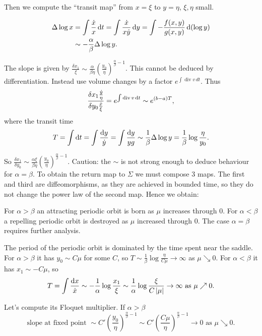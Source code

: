 \documentclass{notes}
\theoremstyle{plain}
\DeclareMathOperator{\dive}{div}
\begin{document}
Then we compute the ``transit map'' from $x=\xi$ to $y=\eta$, $\xi, \eta$
small.

\begin{align*}
\Delta \log x &= \int \frac{\dot{x}}{x}\, \mathrm{d} t
= \int \frac{\dot{x}}{x \dot{y}}\,\mathrm{d} y =
\int - \frac{f(x,y)}{g(x,y)}\,\mathrm{d}(\log y) \\
&\sim - \frac{\alpha}{\beta} \Delta \log y.
\end{align*}

The slope is given by $\frac{\delta x_1}{\xi} \sim \frac{\alpha}{\beta \eta}
\left( \frac{y_0}{\eta} \right)^{\frac{\alpha}{\beta}-1}$.  This cannot
be deduced by differentiation.  Instead use volume changes by a factor
$e^{\int \dive v\, dt}$.  Thus
\[
\frac{\delta x_1 \frac{\dot{y}}{\eta}}{\delta y_0 \frac{\dot{x}}{\xi}}
= e^{\int \dive v\,\ud t} \sim e^{(b-a)T},
\]
where the transit time
\[
T = \int \mathrm{d} t = \int \frac{\mathrm{d} y}{\dot{y}} = \int \frac{\mathrm{d} y}{y g}
\sim \frac{1}{\beta} \Delta \log y = \frac{1}{\beta} \log \frac{\eta}{y_0}.
\]
\parbox{3in}{
So $\frac{\delta x_1}{\delta y_0} \sim \frac{ \alpha \xi}{\beta \eta}
\left( \frac{y_0}{\eta} \right)^{\frac{\alpha}{\beta}-1}.$
Caution: the $\sim$ is not strong enough to deduce behaviour for
$\alpha = \beta$.  To obtain the return map to $\Sigma$ we must compose
3 maps.  The first and third are diffeomorphisms, as they are achieved in
bounded time, so they do not change the power law of the second map.
Hence we obtain:}

\vspace{2in}

For $\alpha > \beta$ an attracting periodic orbit is born as $\mu$ increases
through $0$.  For $\alpha < \beta$ a repelling periodic orbit is destroyed
as $\mu$ increased through $0$.  The case $\alpha = \beta$ requires further
analysis.

\vspace{1.5in}

The period of the periodic orbit is dominated by the time spent near the
saddle.  For $\alpha > \beta$ it has $y_0 \sim C \mu$ for some $C$,
so $T \sim \frac{1}{\beta} \log \frac{\eta}{C \mu} \to \infty$ as $\mu 
\searrow 0$.  For $\alpha < \beta$ it has $x_1 \sim - C \mu$, so
\[
T = \int \frac{\mathrm{d} x}{\dot{x}} \sim - \frac{1}{\alpha} \log \frac{x_1}{\xi}
\sim \frac{1}{\alpha} \log \frac{\xi}{C \left|\mu\right|}
\to \infty \text{ as } \mu \nearrow 0.
\]

Let's compute its Floquet multiplier.  If $\alpha > \beta$
\[
\text{slope at fixed point }
\sim C' \left(\frac{y_0}{\eta}
\right)^{\frac{\alpha}{\beta} - 1} \sim C' 
\left( \frac{C \mu}{\eta}
\right)^{\frac{\alpha}{\beta} - 1} \to 0 \text{ as } \mu \searrow 0.
\]
\end{document}
